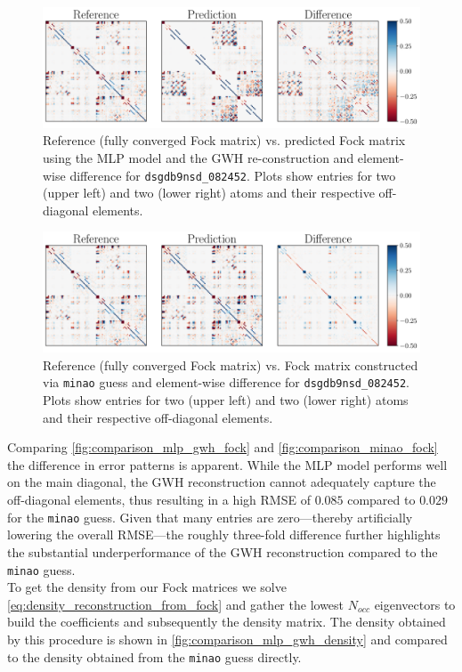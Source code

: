 \begin{figure}[H]
    \centering
    \includegraphics[width=\textwidth]{../fig/mlp_further_trials/fock_truth_vs_pred.pdf}
    \caption[MLP vs. reference Fock]{Reference (fully converged Fock matrix) vs. predicted Fock matrix using the MLP model and the GWH re-construction and element-wise difference for \texttt{dsgdb9nsd\_082452}. Plots show entries for two  (upper left) and two  (lower right) atoms and their respective off-diagonal elements.}
    \label{fig:comparison_mlp_gwh_fock}
\end{figure}

\begin{figure}[H]
    \centering
    \includegraphics[width=\textwidth]{../fig/mlp_further_trials/fock_truth_vs_minao.pdf}
    \caption[\texttt{minao} vs. reference Fock]{Reference (fully converged Fock matrix) vs. Fock matrix constructed via \texttt{minao} guess and element-wise difference for \texttt{dsgdb9nsd\_082452}. Plots show entries for two  (upper left) and two  (lower right) atoms and their respective off-diagonal elements.}
    \label{fig:comparison_minao_fock}
\end{figure}
Comparing \autoref{fig:comparison_mlp_gwh_fock} and \autoref{fig:comparison_minao_fock} the difference in error patterns is apparent. While the MLP model performs well on the main diagonal, the GWH reconstruction cannot adequately capture the off-diagonal elements, thus resulting in a high RMSE of $0.085$ compared to $0.029$ for the \texttt{minao} guess. Given that many entries are zero—thereby artificially lowering the overall RMSE—the roughly three-fold difference further highlights the substantial underperformance of the GWH reconstruction compared to the \texttt{minao} guess.\\
To get the density from our Fock matrices we solve \autoref{eq:density_reconstruction_from_fock} and gather the lowest $N_{occ}$ eigenvectors to build the coefficients and subsequently the density matrix. The density obtained by this procedure is shown in \autoref{fig:comparison_mlp_gwh_density} and compared to the density obtained from the \texttt{minao} guess directly.


